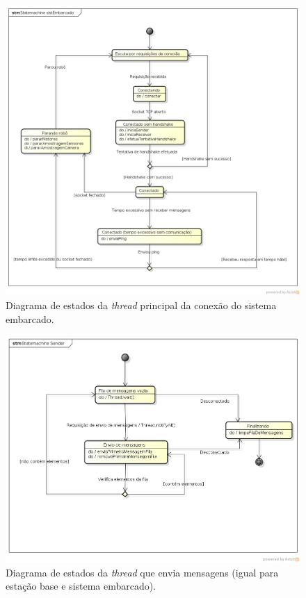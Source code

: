 \begin{figure}[H]
  \centering
  \includegraphics[width=\textwidth, keepaspectratio]{./figuras/diagrama_estados_sist_embarcado.png}
  \caption{Diagrama de estados da \textit{thread} principal da conexão do sistema embarcado.}
  \label{fig:diagrama_estados_sist_embarcado}
\end{figure}

\begin{figure}[H]
  \centering
  \includegraphics[width=\textwidth, keepaspectratio]{./figuras/diagrama_estados_sender.png}
  \caption{Diagrama de estados da \textit{thread} que envia mensagens (igual para estação base e sistema embarcado).}
  \label{fig:diagrama_estados_sender}
\end{figure}

